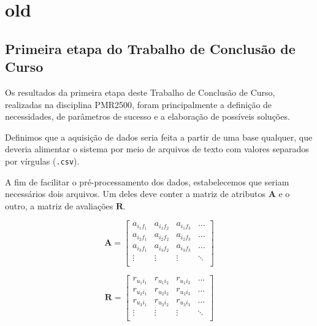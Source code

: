 
\chapter[old]{old}
\label{chap:old}

\section{Primeira etapa do Trabalho de Conclusão de Curso} %
\label{sec:primeira_etapa_do_trabalho_de_conclus_o_de_curso}

Os resultados da primeira etapa deste Trabalho de Conclusão de Curso, realizadas na disciplina PMR2500, foram principalmente a definição de necessidades, de parâmetros de sucesso e a elaboração de possíveis soluções. 

Definimos que a aquisição de dados seria feita a partir de uma base qualquer, que deveria alimentar o sistema por meio de arquivos de texto com valores separados por vírgulas (\texttt{.csv}).

A fim de facilitar o pré-processamento dos dados, estabelecemos que seriam necessários dois arquivos. Um deles deve conter a matriz de atributos $\mathbf{A}$ e o outro, a matriz de avaliações  $\mathbf{R}$. 

\begin{equation} 
\mathbf{A} = 
\begin{bmatrix} 
 a_{i_1 f_1} &  a_{i_1 f_2} &  a_{i_1 f_3}  & \dots   \\
 a_{i_2 f_1} &  a_{i_2 f_2} &  a_{i_2 f_3}  & \dots   \\
 a_{i_3 f_1} &  a_{i_3 f_2} &  a_{i_3 f_3}  & \dots  \\ 
 \vdots &  \vdots &  \vdots  & \ddots   \\
 \end{bmatrix}
\end{equation}


\begin{equation}
	  \mathbf{R} = 
\begin{bmatrix} 
  r_{u_1 i_1} &  r_{u_1 i_2} &  r_{u_1 i_3}  & \dots   \\
 r_{u_2 i_1} &  r_{u_2 i_2} &  r_{u_2 i_3}  & \dots   \\
 r_{u_3 i_1} &  r_{u_3 i_2} &  r_{u_3 i_3}  & \dots  \\ 
 \vdots &  \vdots &  \vdots  & \ddots   \\
\end{bmatrix}
\end{equation}


